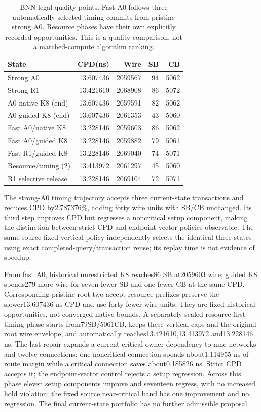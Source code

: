 \documentclass[conference,10pt]{IEEEtran}
\begin{document}
\begin{table}[t]
\centering\caption{BNN legal quality points. Fast A0 follows three automatically selected timing commits from pristine strong A0. Resource phases have their own explicitly recorded opportunities. This is a quality comparison, not a matched-compute algorithm ranking.}
\label{tab:bnn}
\small
\begin{tabular}{lrrrr}\hline
State & CPD(ns) & Wire & SB & CB\\\hline
Strong A0 &13.607436&2059567&94&5062\\
Strong R1 &13.421610&2068908&86&5072\\
A0 native K8 (end) &13.607436&2059591&82&5062\\
A0 guided K8 (end) &13.607436&2061353&43&5060\\
Fast A0/native K8 &13.228146&2059603&86&5062\\
Fast A0/guided K8 &13.228146&2059882&79&5061\\
Fast R1/guided K8 &13.228146&2069040&74&5071\\
Resource/timing (2) &13.413972&2061297&45&5060\\
R1 selective release &13.228146&2069104&72&5071\\\hline
\end{tabular}
\end{table}
The strong-A0 timing trajectory accepts three current-state transactions and reduces CPD by2.787376\%, adding forty wire units with SB/CB unchanged. Its third step improves CPD but regresses a noncritical setup component, making the distinction between strict CPD and endpoint-vector policies observable. The same-source fixed-vertical policy independently selects the identical three states using exact completed-query/transaction reuse; its replay time is not evidence of speedup.

From fast A0, historical unrestricted K8 reaches86 SB at2059603 wire; guided K8 spends279 more wire for seven fewer SB and one fewer CB at the same CPD. Corresponding pristine-root two-accept resource prefixes preserve the slower13.607436 ns CPD and use forty fewer wire units. They are fixed historical opportunities, not converged native bounds. A separately sealed resource-first timing phase starts from79SB/5061CB, keeps these vertical caps and the original root wire envelope, and automatically reaches13.421610,13.413972 and13.228146 ns. The last repair expands a current critical-owner dependency to nine networks and twelve connections: one noncritical connection spends about1.114955 ns of route margin while a critical connection saves about0.185826 ns. Strict CPD accepts it; the endpoint-vector control rejects a setup regression. Across this phase eleven setup components improve and seventeen regress, with no increased hold violation; the fixed source near-critical band has one improvement and no regression. The final current-state portfolio has no further admissible proposal.
\end{document}
